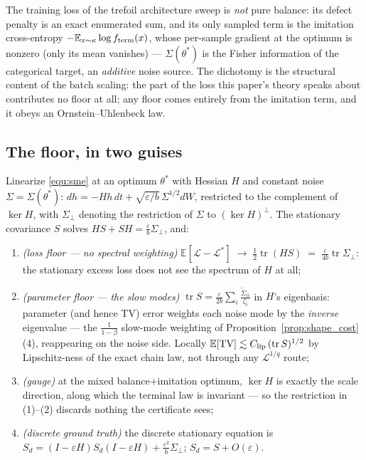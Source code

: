 The training loss of the trefoil architecture sweep is \emph{not} pure
balance: its defect penalty is an exact enumerated sum, and its only sampled term is the
imitation cross-entropy $-\mathbb E_{x\sim\kappa}\log f_{\mathrm{term}}(x)$, whose per-sample
gradient at the optimum is nonzero (only its mean vanishes) --- $\Sigma(\theta^*)$ is
the Fisher information of the categorical target, an \emph{additive} noise source. The
dichotomy is the structural content of the batch scaling: the part of the loss this
paper's theory speaks about contributes no floor at all; any floor comes entirely from
the imitation term, and it obeys an Ornstein--Uhlenbeck law.

\subsection{The floor, in two guises}\label{sec:floor}

\begin{proposition}\label{prop:additive_floor}
Linearize \eqref{equ:sme} at an optimum $\theta^*$ with Hessian $H$ and constant noise
$\Sigma = \Sigma(\theta^*)$: $dh = -Hh\,dt + \sqrt{\varepsilon/b}\,\Sigma^{1/2}dW$,
restricted to the complement of $\ker H$, with $\Sigma_\perp$ denoting the restriction
of $\Sigma$ to $(\ker H)^\perp$. The stationary covariance $S$ solves
$HS+SH = \tfrac{\varepsilon}{b}\Sigma_\perp$, and:
\begin{enumerate}
    \item \emph{(loss floor --- no spectral weighting)}\;
    $\mathbb E[\mathcal L-\mathcal L^*] \;\to\; \tfrac12\operatorname{tr}(HS)
    \;=\; \frac{\varepsilon}{4b}\operatorname{tr}\Sigma_\perp$: the stationary excess
    loss does not see the spectrum of $H$ at all;
    \item \emph{(parameter floor --- the slow modes)}\;
    $\operatorname{tr} S = \frac{\varepsilon}{2b}\sum_i
    \frac{\widetilde\Sigma_{ii}}{\zeta_i}$ in $H$'s eigenbasis: parameter (and hence
    TV) error weights each noise mode by the \emph{inverse} eigenvalue --- the
    $\frac1{1-\beta}$ slow-mode weighting of Proposition~\ref{prop:shape_cost}(4),
    reappearing on the noise side. Locally
    $\mathbb E[\mathrm{TV}] \lesssim C_{\mathrm{lip}}\,(\operatorname{tr}S)^{1/2}$ by
    Lipschitz-ness of the exact chain law, not through any $\mathcal L^{1/q}$ route;
    \item \emph{(gauge)} at the mixed balance$+$imitation optimum, $\ker H$ is exactly
    the scale direction, along which the terminal law is invariant --- so the
    restriction in (1)--(2) discards nothing the certificate sees;
    \item \emph{(discrete ground truth)} the discrete stationary equation is
    $S_d = (I-\varepsilon H)S_d(I-\varepsilon H) + \tfrac{\varepsilon^2}b\Sigma_\perp$;
    $S_d = S + O(\varepsilon)$.
\end{enumerate}
\end{proposition}

